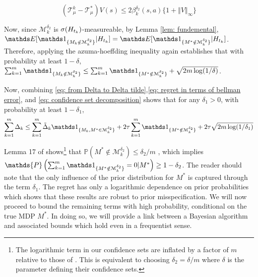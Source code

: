 \begin{equation} \label{eq: maximum bellman error within confidence set}
(\mathcal{T}^{k}_{\mu} - \mathcal{T}^{*}_{\mu})V(s) \leq 2 \beta_k^{\delta_2}(s,a) \{ 1+ \left\Vert V \right\Vert_{\infty} \}
\end{equation}

Now, since $\mathcal{M}_{k}^{\delta_{2}}$ is $\sigma ({H}_{t_k})$-measureable, by Lemma \ref{lem: fundemental}, 
$\Exp [\Ind_{\{M_k \notin \mathcal{M}_k^{\delta_2}\}} \vert H_{t_k}] =  \Exp [\Ind_{\{M^* \notin \mathcal{M}_k^{\delta_2}\}}\vert H_{t_k}]$.
 Therefore, applying the azuma-hoeffding inequality again establishes that with probability at least $1-\delta$, $\sum_{k=1}^{m} \Ind_{\{M_k \notin \mathcal{M}_k^{\delta_2}\}} \leq \sum_{k=1}^{m} \Ind_{\{M^* \notin \mathcal{M}_k^{\delta_2}\}} +\sqrt{2m \log(1/\delta)}$.

Now, combining \eqref{eq: from Delta to Delta tilde},\eqref{eq: regret in terms of bellman error}, and \eqref{eq: confidence set decomposition} shows that for any $\delta_1>0$, with probability at least $1-\delta_1$, 
\begin{equation} \label{eq: Regret Decomposition with confidence sets}
\sum_{k=1}^{m} \Delta_k \leq \sum_{k=1}^{m} \tilde{\Delta}_k  \Ind_{\{M_k, M^* \in \mathcal{M}_k^{\delta_2}\}}
+ 2\tau\sum_{k=1}^{m} \Ind_{\{M^* \notin \mathcal{M}^{\delta_2}_k\}}
+2\tau \sqrt{2m \log(1/\delta_{1})}
\end{equation}
 
 Lemma 17 of \cite{jaksch2010near} shows\footnote{The logarithmic term in our confidence sets are inflated by a factor of $m$ relative to those of \cite{jaksch2010near}. This is equivalent to choosing $\delta_2=\delta/m$ where $\delta$ is the parameter defining their confidence sets.} that 
$\mathds{P}(M^* \notin \mathcal{M}_k^{\delta_{2}}) \leq \delta_{2}/m$
, which implies 
$\mathds{P}\left(\sum_{k=1}^{m} \Ind_{\{M^* \notin \mathcal{M}_k^{\delta_2}\}} =0 \vert M^* \right)\geq 1-\delta_{2}$.
The reader should note that the only influence of the prior distribution for $M^*$ is captured through the term $\delta_1$. The regret has only a logarithmic dependence on prior probabilities which shows that these results are robust to prior misspecification. We will now proceed to bound the remaining terms with high probability, conditional on the true MDP $M^*$. In doing so, we will provide a link between a Bayesian algorithm and associated bounds which hold even in a frequentist sense.


